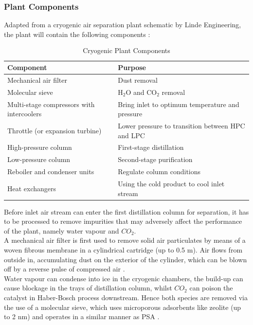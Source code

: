 	\subsubsection{Plant Components} \noindent
    Adapted from a cryogenic air separation plant schematic by Linde Engineering, the plant will contain the following components \citep{linde_cryo}:
    \begin{table}[ht]
        \singlespacing
    	\centering
	    \caption{Cryogenic Plant Components}
	    \label{table:plant_components}

	    \begin{tabular}{|l|l|}
	    \hline
	    Component						& Purpose \\        \hline
	    Mechanical air filter 			& Dust removal \\
	    Molecular sieve					& H$_2$O and CO$_2$ removal \\
	    Multi-stage compressors with intercoolers & Bring inlet to optimum temperature and pressure\\
	    Throttle (or expansion turbine)	& Lower pressure to transition between HPC and LPC\\
	    High-pressure column			& First-stage distillation \\
	    Low-pressure column				& Second-stage purification \\
	    Reboiler and condenser units	& Regulate column conditions\\
	    Heat exchangers					& Using the cold product to cool inlet stream \\  \hline
	    \end{tabular}
    \end{table}
        Before inlet air stream can enter the first distillation column for separation, it has to be processed to remove impurities that may adversely affect the performance of the plant, namely water vapour and $CO_2$. \\
        A mechanical air filter is first used to remove solid air particulates by means of a woven fibrous membrane in a cylindrical cartridge (up to 0.5 \textmu m). Air flows from outside in, accumulating dust on the exterior of the cylinder, which can be blown off by a reverse pulse of compressed air \citep{airfilter}.\\
        Water vapour can condense into ice in the cryogenic chambers, the build-up can cause blockage in the trays of distillation column, whilst $CO_2$ can poison the catalyst in Haber-Bosch process downstream. Hence both species are removed via the use of a molecular sieve, which uses microporous adsorbents like zeolite (up to 2 nm) and operates in a similar manner as PSA \citep{white2017}.
